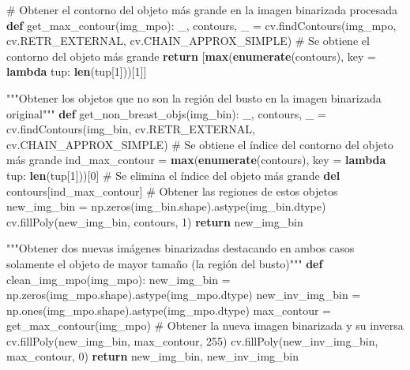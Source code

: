 \documentclass[
]{article}
\newenvironment{Shaded}{\begin{snugshade}}{\end{snugshade}}
\newcommand{\BuiltInTok}[1]{\textcolor[rgb]{0.39,0.29,0.61}{\textbf{#1}}}
\newcommand{\CommentTok}[1]{\textcolor[rgb]{0.54,0.53,0.53}{#1}}
\newcommand{\ControlFlowTok}[1]{\textcolor[rgb]{0.12,0.11,0.11}{\textbf{#1}}}
\newcommand{\DecValTok}[1]{\textcolor[rgb]{0.69,0.50,0.00}{#1}}
\newcommand{\KeywordTok}[1]{\textcolor[rgb]{0.12,0.11,0.11}{\textbf{#1}}}
\newcommand{\NormalTok}[1]{\textcolor[rgb]{0.12,0.11,0.11}{#1}}
\newcommand{\OperatorTok}[1]{\textcolor[rgb]{0.12,0.11,0.11}{#1}}
\begin{document}
\begin{Shaded}
\begin{Highlighting}[]
\CommentTok{\# Obtener el contorno del objeto más grande en la imagen binarizada procesada}
\KeywordTok{def}\NormalTok{ get\_max\_contour(img\_mpo):}
\NormalTok{    \_, contours, \_ }\OperatorTok{=}\NormalTok{ cv.findContours(img\_mpo, cv.RETR\_EXTERNAL, cv.CHAIN\_APPROX\_SIMPLE)}
    \CommentTok{\# Se obtiene el contorno del objeto más grande}
    \ControlFlowTok{return}\NormalTok{ [}\BuiltInTok{max}\NormalTok{(}\BuiltInTok{enumerate}\NormalTok{(contours), key }\OperatorTok{=} \KeywordTok{lambda}\NormalTok{ tup: }\BuiltInTok{len}\NormalTok{(tup[}\DecValTok{1}\NormalTok{]))[}\DecValTok{1}\NormalTok{]]}

\CommentTok{"""Obtener los objetos que no son la región del busto en la}
\CommentTok{imagen binarizada original"""}
\KeywordTok{def}\NormalTok{ get\_non\_breast\_objs(img\_bin):}
\NormalTok{    \_, contours, \_ }\OperatorTok{=}\NormalTok{ cv.findContours(img\_bin, cv.RETR\_EXTERNAL, cv.CHAIN\_APPROX\_SIMPLE)}
    \CommentTok{\# Se obtiene el índice del contorno del objeto más grande}
\NormalTok{    ind\_max\_contour }\OperatorTok{=} \BuiltInTok{max}\NormalTok{(}\BuiltInTok{enumerate}\NormalTok{(contours), key }\OperatorTok{=} \KeywordTok{lambda}\NormalTok{ tup: }\BuiltInTok{len}\NormalTok{(tup[}\DecValTok{1}\NormalTok{]))[}\DecValTok{0}\NormalTok{]}
    \CommentTok{\# Se elimina el índice del objeto más grande}
    \KeywordTok{del}\NormalTok{ contours[ind\_max\_contour]}
    \CommentTok{\# Obtener las regiones de estos objetos}
\NormalTok{    new\_img\_bin }\OperatorTok{=}\NormalTok{ np.zeros(img\_bin.shape).astype(img\_bin.dtype)}
\NormalTok{    cv.fillPoly(new\_img\_bin, contours, }\DecValTok{1}\NormalTok{)}
    \ControlFlowTok{return}\NormalTok{ new\_img\_bin}

\CommentTok{"""Obtener dos nuevas imágenes binarizadas destacando en ambos casos solamente}
\CommentTok{el objeto de mayor tamaño (la región del busto)"""}
\KeywordTok{def}\NormalTok{ clean\_img\_mpo(img\_mpo):}
\NormalTok{    new\_img\_bin }\OperatorTok{=}\NormalTok{ np.zeros(img\_mpo.shape).astype(img\_mpo.dtype)}
\NormalTok{    new\_inv\_img\_bin }\OperatorTok{=}\NormalTok{ np.ones(img\_mpo.shape).astype(img\_mpo.dtype)}
\NormalTok{    max\_contour }\OperatorTok{=}\NormalTok{ get\_max\_contour(img\_mpo)}
    \CommentTok{\# Obtener la nueva imagen binarizada y su inversa}
\NormalTok{    cv.fillPoly(new\_img\_bin, max\_contour, }\DecValTok{255}\NormalTok{)}
\NormalTok{    cv.fillPoly(new\_inv\_img\_bin, max\_contour, }\DecValTok{0}\NormalTok{)}
    \ControlFlowTok{return}\NormalTok{ new\_img\_bin, new\_inv\_img\_bin}


\end{Highlighting}
\end{Shaded}
\end{document}
